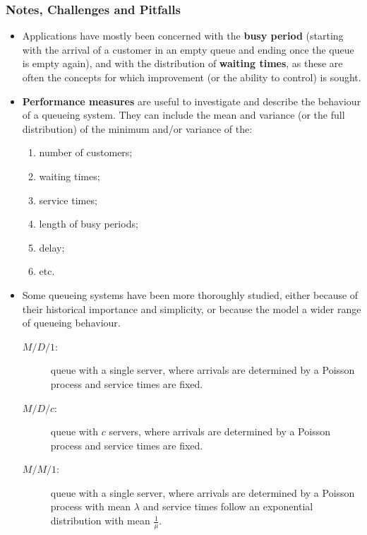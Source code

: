 \subsubsection{Notes, Challenges and Pitfalls}
\begin{itemize}[noitemsep]
\item Applications have mostly been concerned with the \textbf{busy period} (starting with the arrival of a customer in an empty queue and ending once the queue is empty again), and with the distribution of \textbf{waiting times}, as these are often the concepts for which improvement (or the ability to control) is sought. 
\item \textbf{Performance measures} are useful to investigate and describe the behaviour of a queueing system. They can include the mean and variance (or the full distribution) of the minimum and/or variance of the: 
\begin{enumerate}
\item number of customers;
\item waiting times;
\item service times;
\item length of busy periods;
\item delay;
\item etc.
\end{enumerate}
\item Some queueing systems have been more thoroughly studied, either because of their historical importance and simplicity, or because the model a wider range of queueing behaviour.  
\begin{description}
\item[$M/D/1$:] queue  with a single server, where arrivals are determined by a Poisson process and  service times are fixed. \item[$M/D/c$:] queue with $c$ servers, where arrivals are determined by a Poisson process and  service times are fixed.
\item[$M/M/1$:] queue with a single server, where arrivals are determined by a Poisson process with mean $\lambda$ and  service times follow an exponential distribution with mean $\frac{1}{\mu}$. 


\end{description}
\end{itemize}
